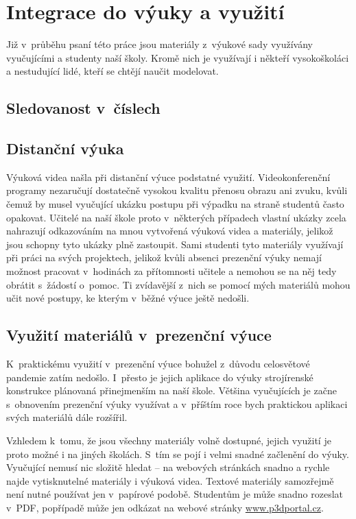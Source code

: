 \chapter{Integrace do výuky a využití}
Již v~průběhu psaní této práce jsou materiály z~výukové sady využívány vyučujícími a studenty naší školy.
Kromě nich je využívají i někteří vysokoškoláci a nestudující lidé, kteří se chtějí naučit modelovat.

\section{Sledovanost v~číslech}
\B{\textcolor{mygreen}{PŠ: Tuto sekci bych rád vztáhnul ke konkrétnímu datu a zmínil konkrétní čísla. Rád bych počkal ještě nějakou chvíli, mezitím by se sledovanost měla přehoupnout přes ty dva tisíce. TZN napíšu nejpozději ve středu večer... }\normalsize}

\section{Distanční výuka}
Výuková videa našla při distanční výuce podstatné využití.
Videokonferenční programy nezaručují dostatečně vysokou kvalitu přenosu obrazu ani zvuku, kvůli čemuž by musel vyučující ukázku postupu při výpadku na straně studentů často opakovat.
Učitelé na naší škole proto v~některých případech vlastní ukázky zcela nahrazují odkazováním na mnou vytvořená výuková videa a materiály, jelikož jsou schopny tyto ukázky plně zastoupit.
Sami studenti tyto materiály využívají při práci na svých projektech, jelikož kvůli absenci prezenční výuky nemají možnost pracovat v~hodinách za přítomnosti učitele a nemohou se na něj tedy obrátit s~žádostí o~pomoc.
Ti zvídavější z~nich se pomocí mých materiálů mohou učit nové postupy, ke kterým v~běžné výuce ještě nedošli.

\section{Využití materiálů v~prezenční výuce}
K~praktickému využití v~prezenční výuce bohužel z~důvodu celosvětové pandemie zatím nedošlo. 
I~přesto je jejich aplikace do výuky strojírenské konstrukce plánovaná přinejmenším na naší škole.
Většina vyučujících je začne s~obnovením prezenční výuky využívat a v~příštím roce bych praktickou aplikaci svých materiálů dále rozšířil.

Vzhledem k~tomu, že jsou všechny materiály volně dostupné, jejich využití je proto možné i na jiných školách.
S~tím se pojí i velmi snadné začlenění do výuky.
Vyučující nemusí nic složitě hledat -- na webových stránkách snadno a rychle najde vytisknutelné materiály i výuková videa.
Textové materiály samozřejmě není nutné používat jen v~papírové podobě. Studentům je může snadno rozeslat v~PDF, popřípadě může jen odkázat na webové stránky \href{https://www.p3dportal.cz}{www.p3dportal.cz}.

